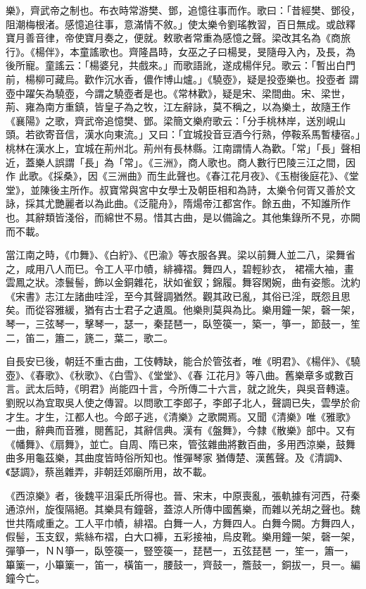 \begin{pinyinscope}
 樂》，齊武帝之制也。布衣時常游樊、鄧，追憶往事而作。歌曰：「昔經樊、鄧役，阻潮梅根渚。感憶追往事，意滿情不敘。」使太樂令劉瑤教習，百日無成。或啟釋寶月善音律，帝使寶月奏之，便就。敕歌者常重為感憶之聲。梁改其名為《商旅行》。《楊伴》，本童謠歌也。齊隆昌時，女巫之子曰楊旻，旻隨母入內，及長，為後所寵。童謠云：「楊婆兒，共戲來。」而歌語訛，遂成楊伴兒。歌云：「暫出白門前，楊柳可藏烏。歡作沉水香，儂作博山爐。」《驍壺》，疑是投壺樂也。投壺者
 謂壺中躍矢為驍壺，今謂之驍壺者是也。《常林歡》，疑是宋、梁間曲。宋、梁世，荊、雍為南方重鎮，皆皇子為之牧，江左辭詠，莫不稱之，以為樂土，故隨王作《襄陽》之歌，齊武帝追憶樊、鄧。梁簡文樂府歌云：「分手桃林岸，送別峴山頭。若欲寄音信，漢水向東流。」又曰：「宜城投音豆酒今行熟，停鞍系馬暫棲宿。」桃林在漢水上，宜城在荊州北。荊州有長林縣。江南謂情人為歡。「常」「長」聲相近，蓋樂人誤謂「長」為「常」。《三洲》，商人歌也。商人數行巴陵三江之間，因作
 此歌。《採桑》，因《三洲曲》而生此聲也。《春江花月夜》、《玉樹後庭花》、《堂堂》，並陳後主所作。叔寶常與宮中女學士及朝臣相和為詩，太樂令何胥又善於文詠，採其尤艷麗者以為此曲。《泛龍舟》，隋煬帝江都宮作。餘五曲，不知誰所作也。其辭類皆淺俗，而綿世不易。惜其古曲，是以備論之。其他集錄所不見，亦闕而不載。



 當江南之時，《巾舞》、《白紵》、《巴渝》等衣服各異。梁以前舞人並二八，梁舞省之，咸用八人而巳。令工人平巾幘，緋褲褶。舞四人，碧輕紗衣，
 裙襦大袖，畫雲鳳之狀。漆鬟髻，飾以金銅雜花，狀如雀釵；錦履。舞容閑婉，曲有姿態。沈約《宋書》志江左諸曲哇淫，至今其聲調猶然。觀其政已亂，其俗已淫，既怨且思矣。而從容雅緩，猶有古士君子之遺風。他樂則莫與為比。樂用鐘一架，磬一架，琴一，三弦琴一，擊琴一，瑟一，秦琵琶一，臥箜篌一，築一，箏一，節鼓一，笙二，笛二，簫二，篪二，葉二，歌二。



 自長安已後，朝廷不重古曲，工伎轉缺，能合於管弦者，唯《明君》、《楊伴》、《驍壺》、《春歌》、《秋歌》、《白雪》、《堂堂》、《春
 江花月》等八曲。舊樂章多或數百言。武太后時，《明君》尚能四十言，今所傳二十六言，就之訛失，與吳音轉遠。劉貺以為宜取吳人使之傳習。以問歌工李郎子，李郎子北人，聲調已失，雲學於俞才生。才生，江都人也。今郎子逃，《清樂》之歌闕焉。又聞《清樂》唯《雅歌》一曲，辭典而音雅，閱舊記，其辭信典。漢有《盤舞》，今隸《散樂》部中。又有《幡舞》、《扇舞》，並亡。自周、隋已來，管弦雜曲將數百曲，多用西涼樂，鼓舞曲多用龜茲樂，其曲度皆時俗所知也。惟彈琴家
 猶傳楚、漢舊聲。及《清調》、《瑟調》，蔡邕雜弄，非朝廷郊廟所用，故不載。



 《西涼樂》者，後魏平沮渠氏所得也。晉、宋末，中原喪亂，張軌據有河西，苻秦通涼州，旋復隔絕。其樂具有鐘磬，蓋涼人所傳中國舊樂，而雜以羌胡之聲也。魏世共隋咸重之。工人平巾幘，緋褶。白舞一人，方舞四人。白舞今闕。方舞四人，假髻，玉支釵，紫絲布褶，白大口褲，五彩接袖，烏皮靴。樂用鐘一架，磬一架，彈箏一，ＮＮ箏一，臥箜篌一，豎箜篌一，琵琶一，五弦琵琶
 一，笙一，簫一，篳篥一，小篳篥一，笛一，橫笛一，腰鼓一，齊鼓一，簷鼓一，銅拔一，貝一。編鐘今亡。




\end{pinyinscope}
